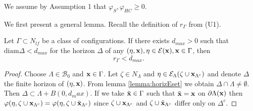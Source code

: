 We assume by Assumption 1 that $\varphi_S,\varphi_{HC}\geq 0$.




We first present a general lemma. Recall the definition of $r_\Gamma$ from (U1). 
\begin{lemma}\label{lemma:U1}
	Let $\Gamma \subset N_{lf}$ be a class of configurations. If there exists $d_{max}>0$ such that $\mathrm{diam}\Delta < d_{max}$ for the horizon $\Delta$ of any $(\eta,{\mathbf{x}}), \eta \in \mathcal E({\mathbf{x}}), {\mathbf{x}} \in \Gamma$, then 
	$$r_\Gamma < d_{max}.$$
\end{lemma}
\begin{proof}
	Choose $\Lambda\in \mathcal B_0$ and ${\mathbf{x}} \in \Gamma$. Let $\zeta \in N_\Lambda$ and $\eta \in \mathcal E_\Lambda(\zeta \cup {\mathbf{x}}_{\Lambda^c})$ and denote $\Delta$ the finite horizon of $(\eta,{\mathbf{x}})$. From lemma \ref{lemma:horizEset} we obtain $\Delta\cap\Lambda \neq \emptyset$. Then $\Delta \subset \Lambda + B(0,d_max)$. If we take $\tilde{{\mathbf{x}}} \in \Gamma$ such that $\tilde{{\mathbf{x}}} = {\mathbf{x}}$ on $\partial\Lambda({\mathbf{x}})$ then $\varphi(\eta,\zeta \cup {\mathbf{x}}_{\Lambda^c}) = \varphi(\eta,\zeta\cup \tilde {{\mathbf{x}}}_{\Lambda^c})$ since $\zeta\cup{\mathbf{x}}_{\Lambda^c}$ and $\zeta\cup\tilde{{\mathbf{x}}}_{\Lambda^c}$ differ only on $\Delta^c$.
\end{proof}


